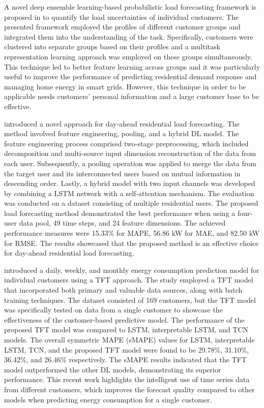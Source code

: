 A novel deep ensemble learning-based probabilistic load forecasting framework is proposed in \cite{YANG2019116324} to quantify the load uncertainties of individual customers.
The presented framework employed the profiles of different customer groups and integrated them into the understanding of the task.
Specifically, customers were clustered into separate groups based on their profiles and a multitask representation learning approach was employed on these groups simultaneously.
This technique led to better feature learning across groups and it was particularly useful to improve the performance of predicting residential demand response and managing home energy in smart grids.
However, this technique in order to be applicable needs customers' personal information and a large customer base to be effective.

\cite{ZANG2021120682} introduced a novel approach for day-ahead residential load forecasting.
The method involved feature engineering, pooling, and a hybrid DL model.
The feature engineering process comprised two-stage preprocessing, which included decomposition and multi-source input dimension reconstruction of the data from each user.
Subsequently, a pooling operation was applied to merge the data from the target user and its interconnected users based on mutual information in descending order.
Lastly, a hybrid model with two input channels was developed by combining a LSTM network with a self-attention mechanism.
The evaluation was conducted on a dataset consisting of multiple residential users.
The proposed load forecasting method demonstrated the best performance when using a four-user data pool, 49 time steps, and 24 feature dimensions.
The achieved performance measures were 15.33\% for MAPE, 56.86 kW for MAE, and 82.50 kW for RMSE.
The results showcased that the proposed method is an effective choice for day-ahead residential load forecasting.

\cite{NAZIR2023100888} introduced a daily, weekly, and monthly energy consumption prediction model for individual customers using a TFT approach.
The study employed a TFT model that incorporated both primary and valuable data sources, along with batch training techniques.
The dataset consisted of 169 customers, but the TFT model was specifically tested on data from a single customer to showcase the effectiveness of the customer-based predictive model.
The performance of the proposed TFT model was compared to LSTM, interpretable LSTM, and TCN models.
The overall symmetric MAPE (sMAPE) values for LSTM, interpretable LSTM, TCN, and the proposed TFT model were found to be 29.78\%, 31.10\%, 36.42\%, and 26.46\% respectively.
The sMAPE results indicated that the TFT model outperformed the other DL models, demonstrating its superior performance.
This recent work highlights the intelligent use of time series data from different customers, which improves the forecast quality compared to other models when predicting energy consumption for a single customer.


